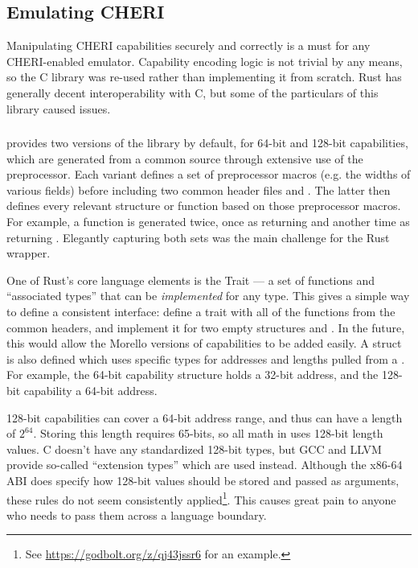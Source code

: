 \subsection{Emulating CHERI}

Manipulating CHERI capabilities securely and correctly is a must for any CHERI-enabled emulator.
Capability encoding logic is not trivial by any means, so the  C library was re-used rather than implementing it from scratch.
Rust has generally decent interoperability with C, but some of the particulars of this library caused issues.

\subsubsection{}
 provides two versions of the library by default, for 64-bit and 128-bit capabilities, which are generated from a common source through extensive use of the preprocessor.
Each variant defines a set of preprocessor macros (e.g. the widths of various fields) before including two common header files  and .
The latter then defines every relevant structure or function based on those preprocessor macros.
For example, a function  is generated twice, once as   returning  and another time as  returning .
Elegantly capturing both sets was the main challenge for the Rust wrapper.

One of Rust's core language elements is the Trait --- a set of functions and \enquote{associated types} that can be \emph{implemented} for any type.
This gives a simple way to define a consistent interface: define a trait  with all of the functions from the common headers, and implement it for two empty structures  and .
In the future, this would allow the Morello versions of capabilities to be added easily.
A struct  is also defined which uses specific types for addresses and lengths pulled from a .
For example, the 64-bit capability structure holds a 32-bit address, and the 128-bit capability a 64-bit address.

128-bit capabilities can cover a 64-bit address range, and thus can have a length of $2^{64}$.
Storing this length requires 65-bits, so all math in  uses 128-bit length values.
C doesn't have any standardized 128-bit types, but GCC and LLVM provide so-called ``extension types'' which are used instead.
Although the x86-64 ABI does specify how 128-bit values should be stored and passed as arguments\cite{specification-x86-psABI-v1.0}, these rules do not seem consistently applied\footnote{See \url{https://godbolt.org/z/qj43jssr6} for an example.}.
This causes great pain to anyone who needs to pass them across a language boundary.

